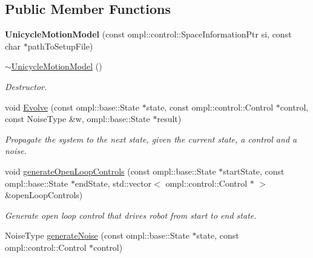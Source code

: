 \subsection*{\-Public \-Member \-Functions}
\begin{DoxyCompactItemize}
\item 
\hypertarget{class_unicycle_motion_model_a7d3d2725d5ae1167921005054c45a6c0}{{\bfseries \-Unicycle\-Motion\-Model} (const ompl\-::control\-::\-Space\-Information\-Ptr si, const char $\ast$path\-To\-Setup\-File)}\label{class_unicycle_motion_model_a7d3d2725d5ae1167921005054c45a6c0}

\item 
\hypertarget{class_unicycle_motion_model_ab5a56555b6b489cc3040fb61c71b5f15}{\hyperlink{class_unicycle_motion_model_ab5a56555b6b489cc3040fb61c71b5f15}{$\sim$\-Unicycle\-Motion\-Model} ()}\label{class_unicycle_motion_model_ab5a56555b6b489cc3040fb61c71b5f15}

\begin{DoxyCompactList}\small\item\em \-Destructor. \end{DoxyCompactList}\item 
\hypertarget{class_unicycle_motion_model_a7d78a6e7de4ad59dbd8aa0e6fd338ca7}{void \hyperlink{class_unicycle_motion_model_a7d78a6e7de4ad59dbd8aa0e6fd338ca7}{\-Evolve} (const ompl\-::base\-::\-State $\ast$state, const ompl\-::control\-::\-Control $\ast$control, const \-Noise\-Type \&w, ompl\-::base\-::\-State $\ast$result)}\label{class_unicycle_motion_model_a7d78a6e7de4ad59dbd8aa0e6fd338ca7}

\begin{DoxyCompactList}\small\item\em \-Propagate the system to the next state, given the current state, a control and a noise. \end{DoxyCompactList}\item 
\hypertarget{class_unicycle_motion_model_adf6f10302c29b5a196628af789e80739}{void \hyperlink{class_unicycle_motion_model_adf6f10302c29b5a196628af789e80739}{generate\-Open\-Loop\-Controls} (const ompl\-::base\-::\-State $\ast$start\-State, const ompl\-::base\-::\-State $\ast$end\-State, std\-::vector$<$ ompl\-::control\-::\-Control $\ast$ $>$ \&open\-Loop\-Controls)}\label{class_unicycle_motion_model_adf6f10302c29b5a196628af789e80739}

\begin{DoxyCompactList}\small\item\em \-Generate open loop control that drives robot from start to end state. \end{DoxyCompactList}\item 
\hypertarget{class_unicycle_motion_model_aff0d7239670e191b7d6ac518952b0428}{\-Noise\-Type \hyperlink{class_unicycle_motion_model_aff0d7239670e191b7d6ac518952b0428}{generate\-Noise} (const ompl\-::base\-::\-State $\ast$state, const ompl\-::control\-::\-Control $\ast$control)}\label{class_unicycle_motion_model_aff0d7239670e191b7d6ac518952b0428}


\end{DoxyCompactItemize}
